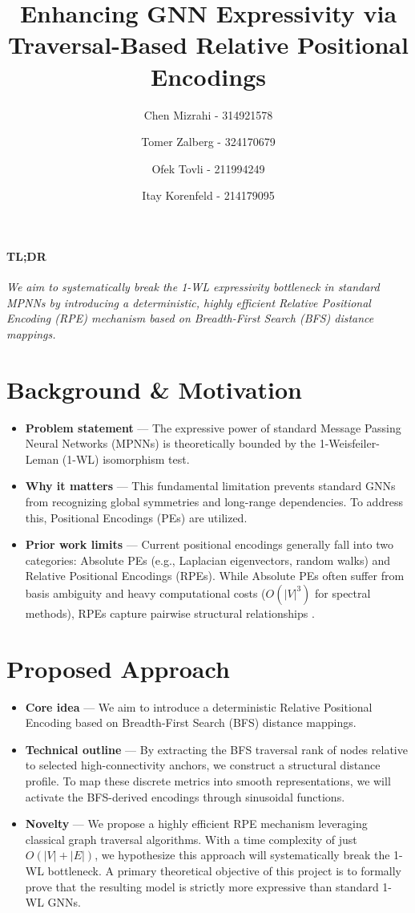 \documentclass{acmart}
\title{Enhancing GNN Expressivity via Traversal-Based Relative Positional Encodings}
\author{Chen Mizrahi - 314921578}
\author{Tomer Zalberg - 324170679}
\author{Ofek Tovli - 211994249}
\author{Itay Korenfeld - 214179095}
\date{}
\begin{document}
\maketitle

\paragraph{TL;DR} \textit{We aim to systematically break the 1-WL expressivity bottleneck in standard MPNNs by introducing a deterministic, highly efficient Relative Positional Encoding (RPE) mechanism based on Breadth-First Search (BFS) distance mappings.}

\section{Background \& Motivation}

\begin{itemize}
  \item[•] \textbf{Problem statement} — The expressive power of standard Message Passing Neural Networks (MPNNs) is theoretically bounded by the 1-Weisfeiler-Leman (1-WL) isomorphism test.
  \item[•] \textbf{Why it matters} — This fundamental limitation prevents standard GNNs from recognizing global symmetries and long-range dependencies. To address this, Positional Encodings (PEs) are utilized. 
  \item[•] \textbf{Prior work limits} — Current positional encodings generally fall into two categories: Absolute PEs (e.g., Laplacian eigenvectors, random walks) and Relative Positional Encodings (RPEs). While Absolute PEs often suffer from basis ambiguity and heavy computational costs ($O(|V|^3)$ for spectral methods), RPEs capture pairwise structural relationships \cite{bruel2022rewiring}.
\end{itemize}

\section{Proposed Approach}

\begin{itemize}
  \item[•] \textbf{Core idea} — We aim to introduce a deterministic Relative Positional Encoding based on Breadth-First Search (BFS) distance mappings. 
  \item[•] \textbf{Technical outline} — By extracting the BFS traversal rank of nodes relative to selected high-connectivity anchors, we construct a structural distance profile. To map these discrete metrics into smooth representations, we will activate the BFS-derived encodings through sinusoidal functions.
  \item[•] \textbf{Novelty} — We propose a highly efficient RPE mechanism leveraging classical graph traversal algorithms. With a time complexity of just $O(|V|+|E|)$, we hypothesize this approach will systematically break the 1-WL bottleneck. A primary theoretical objective of this project is to formally prove that the resulting model is strictly more expressive than standard 1-WL GNNs.
\end{itemize}
\end{document}
